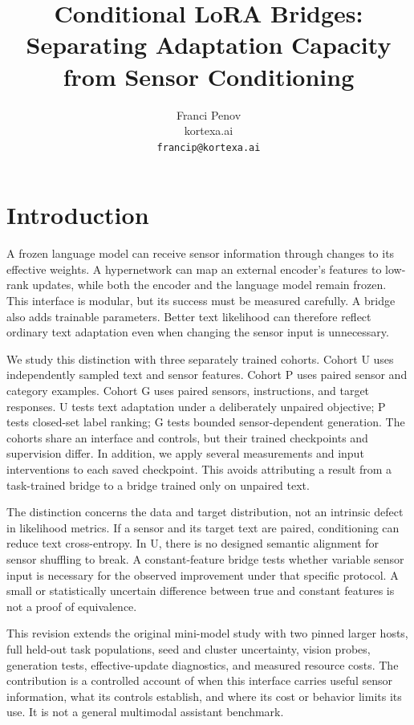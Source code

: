 \documentclass[11pt]{article}
\title{Conditional LoRA Bridges:\\Separating Adaptation Capacity from Sensor Conditioning}
\author{Franci Penov\\kortexa.ai\\\texttt{francip@kortexa.ai}}
\date{\RevisionDate}
\begin{document}
\maketitle
\begin{abstract}

\end{abstract}

\section{Introduction}
A frozen language model can receive sensor information through changes to its
effective weights. A hypernetwork can map an external encoder's features to
low-rank updates, while both the encoder and the language model remain frozen.
This interface is modular, but its success must be measured carefully. A bridge
also adds trainable parameters. Better text likelihood can therefore reflect
ordinary text adaptation even when changing the sensor input is unnecessary.

We study this distinction with three separately trained cohorts. Cohort U uses
independently sampled text and sensor features. Cohort P uses paired sensor and
category examples. Cohort G uses paired sensors, instructions, and target
responses. U tests text adaptation under a deliberately unpaired objective; P
tests closed-set label ranking; G tests bounded sensor-dependent generation.
The cohorts share an interface and controls, but their trained checkpoints and
supervision differ. In addition, we apply several measurements and input
interventions to each saved checkpoint. This avoids attributing a result from a
task-trained bridge to a bridge trained only on unpaired text.

The distinction concerns the data and target distribution, not an intrinsic
defect in likelihood metrics. If a sensor and its target text are paired,
conditioning can reduce text cross-entropy. In U, there is no designed semantic
alignment for sensor shuffling to break. A constant-feature bridge tests whether
variable sensor input is necessary for the observed improvement under that
specific protocol. A small or statistically uncertain difference between true
and constant features is not a proof of equivalence.

This revision extends the original mini-model study with two pinned larger
hosts, full held-out task populations, seed and cluster uncertainty, vision
probes, generation tests, effective-update diagnostics, and measured resource
costs. The contribution is a controlled account of when this interface carries
useful sensor information, what its controls establish, and where its cost or
behavior limits its use. It is not a general multimodal assistant benchmark.
\end{document}
